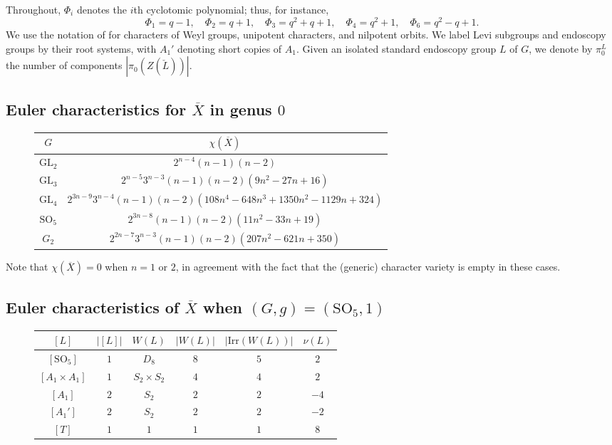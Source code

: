 \documentclass[12pt]{amsart}
\theoremstyle{plain}
\theoremstyle{definition}
\theoremstyle{remark}
\newcommand{\bX}{{X}}
\newcommand{\GL}{\mathrm{GL}}
\newcommand{\SO}{\mathrm{SO}}
\newcommand{\Irr}{\mathrm{Irr}}
\begin{document}
Throughout, $\Phi_i$ denotes the $i$th cyclotomic polynomial; thus, for instance,
\[
\Phi_1=q-1,\quad \Phi_2=q+1,\quad \Phi_3=q^2+q+1,\quad \Phi_4 = q^2+1,\quad \Phi_6 = q^2-q+1.
\]
We use the notation of \cite[\S13]{Carter93} for characters of Weyl groups, unipotent characters, and nilpotent orbits. We label Levi subgroups and endoscopy groups by their root systems, with $A_1'$ denoting short copies of $A_1$. Given an isolated standard endoscopy group $L$ of $G$, we denote by $\pi_0^L$ the number of components $|\pi_0(Z(\check{L}))|$. 
\vskip 20pt 
\subsection{Euler characteristics for $\overline{X}$ in genus $0$}
\mbox{}
\begin{figure}[h]
\centering
\begin{tabular}{|c|c|} 
\hline 
$G$ & $\chi(\overline{\bX})$ \\
\hline 
$\GL_2$ & $2^{n-4} (n-1)(n-2)$ \\ \hline 
$\GL_3$ & $2^{n-5} 3^{n-3} (n-1)(n-2) (9n^2 - 27n + 16)$ \\ \hline 
$\GL_4$ & $2^{3n-9} 3^{n-4} (n-1)(n-2) (108 n^4 - 648 n^3 + 1350 n^2 - 1129 n + 324)$ \\ \hline 
$\SO_5$ & $2^{3n-8} (n-1)(n-2) (11n^2 - 33n + 19)$ \\\hline 
$G_2$ & $2^{2n-7} 3^{n-3} (n-1)(n-2) (207n^2 - 621n + 350)$ \\
\hline 
\end{tabular}
\end{figure}

Note that $\chi(\overline{X})=0$ when $n=1$ or $2$, in agreement with the fact that the (generic) character variety is empty in these cases. \\


\subsection{Euler characteristics of $\overline{X}$ when $(G,g)=(\SO_5, 1)$}\label{s:euler} 
\mbox{}
\vskip 10pt 
\begin{figure}[h]
\centering
\begin{tabular}{|c|ccccc|} 
\hline 
$[L]$ & $|[L]|$ & $W(L)$ & $|W(L)|$ & $|\Irr(W(L))|$ & $\nu(L)$ \\
\hline 
$[\SO_5]$ & $1$ & $D_8$ & $8$ & $5$ & $2$ \\
$[{A_1\times A_1}]$ & $1$ & $S_2\times S_2$ & $4$ & $4$ & $2$ \\
$[{A_1}]$ & $2$ & $S_2$ & $2$ & $2$ & $-4$ \\
$[{A_1'}]$ & $2$ & $S_2$ & $2$ & $2$ & $-2$ \\
$[T]$ & $1$ & $1$ & $1$ & $1$ & $8$ \\
\hline 
\end{tabular}
\end{figure}
\end{document}
